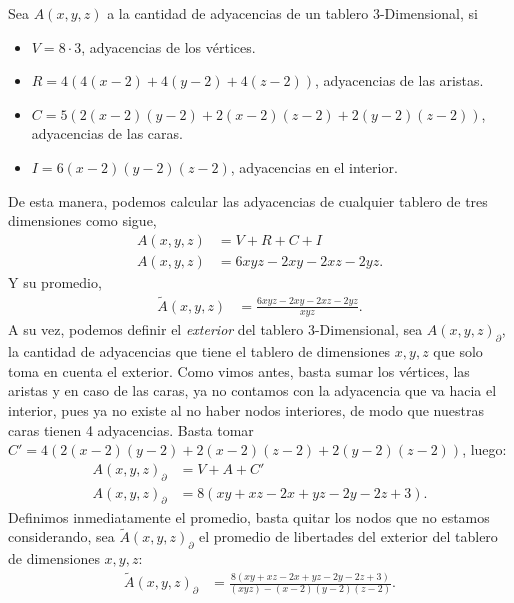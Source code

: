 Sea $A(x,y,z)$ a la cantidad de adyacencias de un  tablero 3-Dimensional, si
\begin{itemize}
	\item$V = 8 \cdot3$, adyacencias de los vértices.
	\item$R =4(4(x-2)+4(y-2)+4(z-2))$, adyacencias de las aristas.
	\item$C=5(2(x-2)(y-2)+2(x-2)(z-2)+2(y-2)(z-2))$, adyacencias de las caras.
	\item$I=6(x-2)(y-2)(z-2)$, adyacencias en el interior.
\end{itemize}
De esta manera, podemos calcular las adyacencias de cualquier tablero de tres dimensiones como sigue,
\begin{align*}
	A(x,y,z)&=V+R+C+I\\
	A(x,y,z)&=6 x y z - 2 x y - 2 x z - 2 y z.
\end{align*}	
Y su promedio,
\begin{align*}
	\tilde{A}(x,y,z)&=\frac{6 x y z - 2 x y - 2 x z - 2 y z}{xyz}.
\end{align*}
A su vez, podemos definir el \textit{exterior} del tablero 3-Dimensional, sea $A(x,y,z)_{\partial}$, la cantidad de adyacencias que tiene el tablero de dimensiones $x,y,z$ que solo toma en cuenta el exterior. Como vimos antes, basta sumar los vértices, las aristas y en caso de las caras, ya no contamos con la adyacencia que va hacia el interior, pues ya no existe al no haber nodos interiores, de modo que nuestras caras tienen 4 adyacencias. Basta tomar $C'= 4(2(x-2)(y-2)+2(x-2)(z-2)+2(y-2)(z-2))$, luego:
\begin{align*}
	A(x,y,z)_{\partial}&=V+A+C'\\
	A(x,y,z)_{\partial}&=8 (x y + x z - 2 x + y z - 2 y - 2 z + 3).
\end{align*}
Definimos inmediatamente el promedio, basta quitar los nodos que no estamos considerando, sea  $\tilde{A}(x,y,z)_{\partial}$ el promedio de libertades del exterior del tablero de dimensiones $x,y,z$:
\begin{align*}
	\tilde{A}(x,y,z)_{\partial}&=\frac{8 (x y + x z - 2 x + y z - 2 y - 2 z + 3)}{(xyz)-(x-2)(y-2)(z-2)}.
\end{align*}
